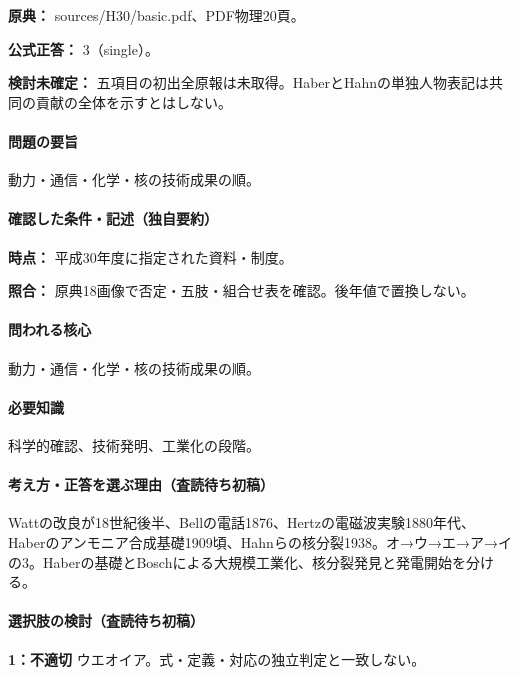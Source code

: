 \noindent\textbf{原典：} sources/H30/basic.pdf、PDF物理20頁。

\textbf{公式正答：} 3（single）。

\par\textbf{検討未確定：} 五項目の初出全原報は未取得。HaberとHahnの単独人物表記は共同の貢献の全体を示すとはしない。

\paragraph{問題の要旨} 動力・通信・化学・核の技術成果の順。

\paragraph{確認した条件・記述（独自要約）}\mbox{}\par

\noindent\textbf{時点：} 平成30年度に指定された資料・制度。\par

\noindent\textbf{照合：} 原典18画像で否定・五肢・組合せ表を確認。後年値で置換しない。\par

\paragraph{問われる核心} 動力・通信・化学・核の技術成果の順。

\paragraph{必要知識} 科学的確認、技術発明、工業化の段階。

\paragraph{考え方・正答を選ぶ理由（査読待ち初稿）} Wattの改良が18世紀後半、Bellの電話1876、Hertzの電磁波実験1880年代、Haberのアンモニア合成基礎1909頃、Hahnらの核分裂1938。オ→ウ→エ→ア→イの3。Haberの基礎とBoschによる大規模工業化、核分裂発見と発電開始を分ける。

\paragraph{選択肢の検討（査読待ち初稿）}\mbox{}\par

\noindent\textbf{1：不適切} ウエオイア。式・定義・対応の独立判定と一致しない。\par

